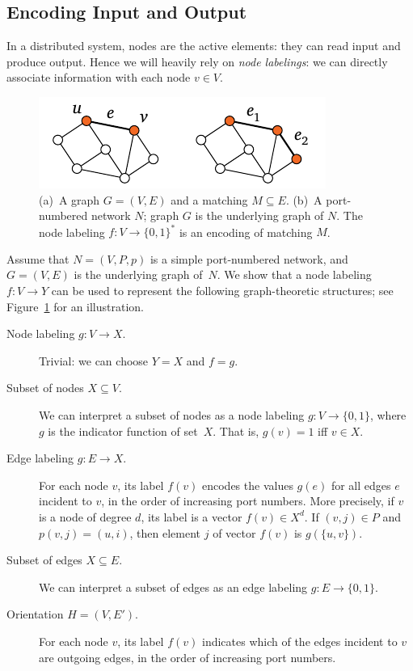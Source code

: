 \subsection{Encoding Input and Output}\label{ssec:encoding-io}

In a distributed system, nodes are the active elements: they can read input and produce output. Hence we will heavily rely on \emph{node labelings}: we can directly associate information with each node $v \in V$.

\begin{figure}
    \centering
    \includegraphics[page=\PPnnD]{figs.pdf}
    \caption{(a)~A graph $G = (V,E)$ and a matching $M \subseteq E$. (b)~A port-numbered network $N$; graph $G$ is the underlying graph of $N$. The node labeling $f\colon V \to \{0,1\}^*$ is an encoding of matching $M$.}\label{fig:pnnd}
\end{figure}

Assume that $N = (V,P,p)$ is a simple port-numbered network, and $G = (V,E)$ is the underlying graph of~$N$. We show that a node labeling $f\colon V \to Y$ can be used to represent the following graph-theoretic structures; see Figure~\ref{fig:pnnd} for an illustration.
\begin{description}
    \item[Node labeling $g\colon V \to X$.]
        Trivial: we can choose $Y = X$ and $f = g$.
    \item[Subset of nodes $X \subseteq V$.]
        We can interpret a subset of nodes as a node labeling $g\colon V \to \{0,1\}$, where $g$ is the indicator function of set~$X$. That is, $g(v) = 1$ iff $v \in X$.
    \item[Edge labeling $g\colon E \to X$.]
        For each node $v$, its label $f(v)$ encodes the values $g(e)$ for all edges $e$ incident to $v$, in the order of increasing port numbers. More precisely, if $v$ is a node of degree $d$, its label is a vector $f(v) \in X^d$. If $(v,j) \in P$ and $p(v,j) = (u,i)$, then element $j$ of vector $f(v)$ is $g(\{u,v\})$.
    \item[Subset of edges $X \subseteq E$.]
        We can interpret a subset of edges as an edge labeling $g\colon E \to \{0,1\}$.
    \item[Orientation $H = (V,E')$.]
        For each node $v$, its label $f(v)$ indicates which of the edges incident to $v$ are outgoing edges, in the order of increasing port numbers.
\end{description}

